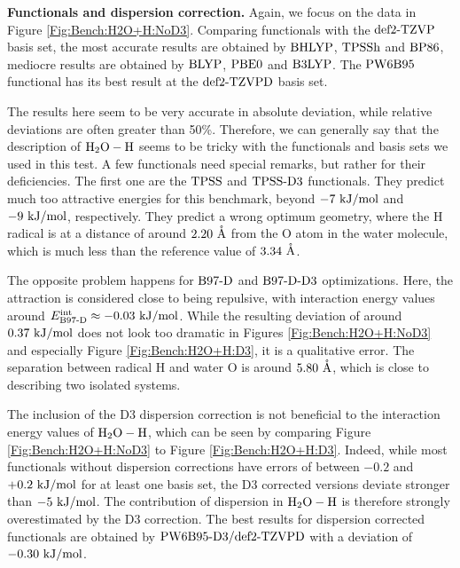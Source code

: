 \textbf{Functionals and dispersion correction.} Again, we focus on the data in
Figure \ref{Fig:Bench:H2O+H:NoD3}. Comparing functionals with the $\text{def2-TZVP}$ basis set,
the most accurate results are obtained by $\text{BHLYP}$, $\text{TPSSh}$ and $\text{BP86}$, mediocre
results are obtained by $\text{BLYP}$, $\text{PBE0}$ and $\text{B3LYP}$. The $\text{PW6B95}$ functional
has its best result at the $\text{def2-TZVPD}$ basis set.

The results here seem to be very accurate in
absolute deviation, while relative deviations are often greater than 50\%.
Therefore, we can generally say that the description of $\mbox{\ensuremath{\text H _2 \text O-\text H}}$ seems to be
tricky with the functionals and basis sets we used in this test. 
A few functionals need special remarks, but rather for their deficiencies. The
first one are the $\text{TPSS}$ and $\text{TPSS}\text{-D3}$ functionals. They predict much too
attractive energies for this benchmark, beyond $-7\ \text {kJ/mol}$ and $-9\ \kmo$,
respectively.
They predict
a wrong optimum geometry, where the H radical is at a distance of around $2.20~\mathring{\text{A}}$
from the O atom in the water molecule, which is much less than the reference
value of $3.34~\mathring{\text{A}}$. 

The opposite problem happens for $\text{B97-D}$ and $\text{B97-D}\text{-D3}$ optimizations. Here, the
attraction is considered close to being repulsive, with interaction energy values around
\mbox{$\eint_{\bns}\approx -0.03\ \kmo$}. While the resulting deviation of around
$0.37\ \text {kJ/mol}$ does not look too dramatic in Figures \ref{Fig:Bench:H2O+H:NoD3} and
especially Figure \ref{Fig:Bench:H2O+H:D3}, it is a qualitative error. The
separation between radical H and water O is around $5.80\ \mathring{\text{A}}$, which is close to describing two isolated
systems.

The inclusion of the D3 dispersion correction is
not beneficial to the interaction energy values of $\mbox{\ensuremath{\text H _2 \text O-\text H}}$, which can be seen
by comparing Figure \ref{Fig:Bench:H2O+H:NoD3} to Figure
\ref{Fig:Bench:H2O+H:D3}. Indeed, while most functionals without dispersion
corrections have errors of between $-0.2$ and $+0.2\ \text {kJ/mol}$ for at least one
basis set, the D3 corrected versions deviate stronger than $-5\ \text {kJ/mol}$.
The contribution of dispersion in $\mbox{\ensuremath{\text H _2 \text O-\text H}}$ is therefore strongly overestimated
by the D3 correction. The best results for dispersion corrected functionals are
obtained by $\text{PW6B95}\text{-D3}/\text{def2-TZVPD}$ with a deviation of $-0.30\ \text {kJ/mol}$.


